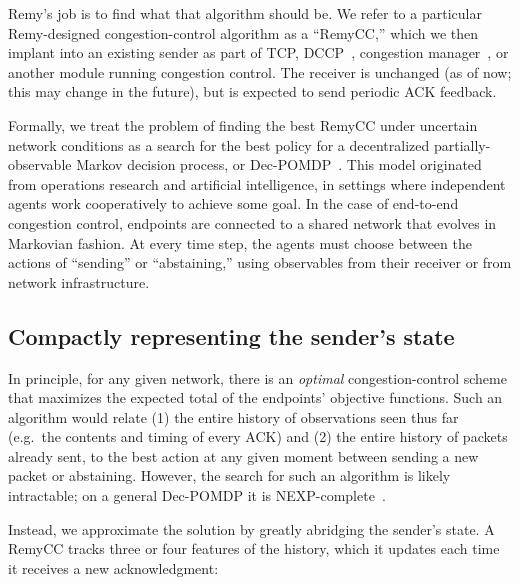 Remy's job is to find what that algorithm should
be.  We refer to a particular Remy-designed congestion-control
algorithm as a ``RemyCC,'' which we then implant into an existing
sender as part of TCP, DCCP~\cite{dccp}, congestion manager~\cite{cm},
or another module running congestion control.  The receiver is
unchanged (as of now; this may change in the future), but is expected
to send periodic ACK feedback.

Formally, we treat the problem of finding the best RemyCC under
uncertain network conditions as a search for the best policy for a
decentralized partially-observable Markov decision
process, or Dec-POMDP~\cite{Oliehoek2012}. This model originated from operations
research and artificial intelligence, in settings where independent
agents work cooperatively to achieve some goal. In the case of
end-to-end congestion control, endpoints are connected to a shared
network that evolves in Markovian fashion. At every time step, the
agents must choose between the actions of ``sending'' or
``abstaining,'' using observables from their receiver or from network
infrastructure.

\subsection{Compactly representing the sender's state}

In principle, for any given network, there is an {\em optimal}
congestion-control scheme that maximizes the expected total of the
endpoints' objective functions. Such an algorithm would relate (1) the
entire history of observations seen thus far (e.g.~the
contents and timing of every ACK) and (2) the entire history of
packets already sent, to the best action at any given moment between sending a new packet or abstaining. However, the search for such an algorithm is likely
intractable; on a general Dec-POMDP it is
NEXP-complete~\cite{Bernstein2002}.

Instead, we approximate the solution by greatly abridging the sender's
state. A RemyCC tracks three or four features of the history, which it
updates each time it receives a new acknowledgment:

